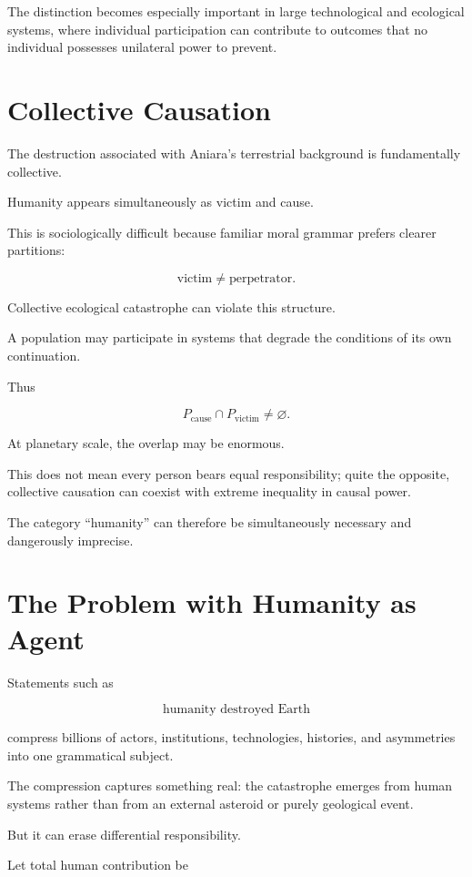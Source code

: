 \documentclass[11pt,oneside]{book}
\theoremstyle{definition}
\theoremstyle{remark}
\begin{document}
The distinction becomes especially important in large technological and ecological systems, where individual participation can contribute to outcomes that no individual possesses unilateral power to prevent.

\section{Collective Causation}

The destruction associated with Aniara's terrestrial background is fundamentally collective.

Humanity appears simultaneously as victim and cause.

This is sociologically difficult because familiar moral grammar prefers clearer partitions:

\[
\text{victim}\neq\text{perpetrator}.
\]

Collective ecological catastrophe can violate this structure.

A population may participate in systems that degrade the conditions of its own continuation.

Thus

\[
P_{\mathrm{cause}}
\cap
P_{\mathrm{victim}}
\neq
\varnothing.
\]

At planetary scale, the overlap may be enormous.

This does not mean every person bears equal responsibility; quite the opposite, collective causation can coexist with extreme inequality in causal power.

The category ``humanity'' can therefore be simultaneously necessary and dangerously imprecise.

\section{The Problem with Humanity as Agent}

Statements such as

\[
\text{humanity destroyed Earth}
\]

compress billions of actors, institutions, technologies, histories, and asymmetries into one grammatical subject.

The compression captures something real: the catastrophe emerges from human systems rather than from an external asteroid or purely geological event.

But it can erase differential responsibility.

Let total human contribution be
\end{document}
